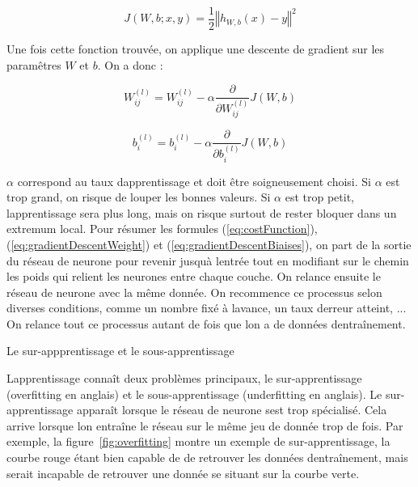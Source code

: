 \documentclass[11pt]{sdm}
\begin{document}
			\begin{equation}
				J(W,b;x,y) = \frac{1}{2} {\left\Vert h_{W,b}(x) - y \right\Vert}^2
				\label{eq:costFunction}
			\end{equation}

			Une fois cette fonction trouv\'ee, on applique une descente de gradient sur les param\^etres $W$ et $b$. On a donc :

			\begin{equation}
				W_{ij}^{(l)} = W_{ij}^{(l)} - \alpha \frac{\partial}{\partial W_{ij}^{(l)}} J(W,b)
				\label{eq:gradientDescentWeight}
			\end{equation}
 
			\begin{equation}
				b_{i}^{(l)} = b_{i}^{(l)} - \alpha \frac{\partial}{\partial b_{i}^{(l)}} J(W,b)
				\label{eq:gradientDescentBiaises}
			\end{equation}

			$\alpha$ correspond au taux d\textquotesingle apprentissage et doit \^etre soigneusement choisi. Si $\alpha$ est trop grand, on risque de louper les bonnes valeurs. Si $\alpha$ est trop petit, l\textquotesingle apprentissage sera plus long, mais on risque surtout de rester bloquer dans un extremum local. Pour r\'esumer les formules (\ref{eq:costFunction}), (\ref{eq:gradientDescentWeight}) et (\ref{eq:gradientDescentBiaises}), on part de la sortie du r\'eseau de neurone pour revenir jusqu\textquotesingle \`a l\textquotesingle entr\'ee tout en modifiant sur le chemin les poids qui relient les neurones entre chaque couche. On relance ensuite le r\'eseau de neurone avec la m\^eme donn\'ee.
			On recommence ce processus selon diverses conditions, comme un nombre fix\'e \`a l\textquotesingle avance, un taux d\textquotesingle erreur atteint, ...
			On relance tout ce processus autant de fois que l\textquotesingle on a de donn\'ees d\textquotesingle entra\^inement.

			\medbreak
			\begin{itshape}Le sur-appprentissage et le sous-apprentissage\end{itshape}
			\smallbreak
			L\textquotesingle apprentissage conna\^it deux probl\`emes principaux, le sur-apprentissage (overfitting en anglais) et le sous-apprentissage (underfitting en anglais).
			Le sur-apprentissage appara\^it lorsque le r\'eseau de neurone s\textquotesingle est trop sp\'ecialis\'e. Cela arrive lorsque l\textquotesingle on entra\^ine le r\'eseau sur le m\^eme jeu de donn\'ee trop de fois. Par exemple, la figure~\ref{fig:overfitting} montre un exemple de sur-apprentissage, la courbe rouge \'etant bien capable de de retrouver les donn\'ees d\textquotesingle entra\^inement, mais serait incapable de retrouver une donn\'ee se situant sur la courbe verte.
\end{document}
